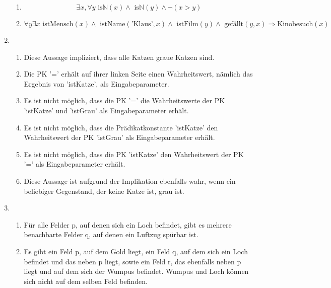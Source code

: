 \documentclass[a4paper]{article}
\begin{document}
\begin{enumerate}
\begin{enumerate}
			\item
			\begin{equation*}
				\exists x, \forall y \text{ is}\mathbb{N}(x) \land \text{ is}\mathbb{N}(y) \land \lnot(x > y)
			\end{equation*}
			
			\item
			\begin{equation*}
				\forall y \exists x \text{ istMensch}(x) \land \text{ istName}(\text{'Klaus'}, x) \land \text{ istFilm}(y) \land \text{ gefällt}(y, x) \Rightarrow \text{Kinobesuch}(x)
			\end{equation*}
		\end{enumerate}
		
		\item
		\begin{enumerate}
			\item
			Diese Aussage impliziert, dass alle Katzen graue Katzen sind.
			
			\item
			Die PK '=' erhält auf ihrer linken Seite einen Wahrheitswert, nämlich das Ergebnis von 'istKatze', als Eingabeparameter.
			
			\item
			Es ist nicht möglich, dass die PK '=' die Wahrheitswerte der PK 'istKatze' und 'istGrau' als Eingabeparameter erhält.
			
			\item
			Es ist nicht möglich, dass die Prädikatkonstante 'istKatze' den Wahrheitswert der PK 'istGrau' als Eingabeparameter erhält.
			
			\item
			Es ist nicht möglich, dass die PK 'istKatze' den Wahrheitswert der PK '=' als Eingabeparameter erhält.
			
			\item
			Diese Aussage ist aufgrund der Implikation ebenfalls wahr, wenn ein beliebiger Gegenstand, der keine Katze ist, grau ist.
		\end{enumerate}
		
		\item
		\begin{enumerate}
			\item
			Für alle Felder p, auf denen sich ein Loch befindet, gibt es mehrere benachbarte Felder q, auf denen ein Luftzug spürbar ist.
			
			\item
			Es gibt ein Feld p, auf dem Gold liegt, ein Feld q, auf dem sich ein Loch befindet und das neben p liegt, sowie ein Feld r, das ebenfalls neben p liegt und auf dem sich der Wumpus befindet. Wumpus und Loch können sich nicht auf dem selben Feld befinden.
			

\end{enumerate}
\end{enumerate}
\end{document}
